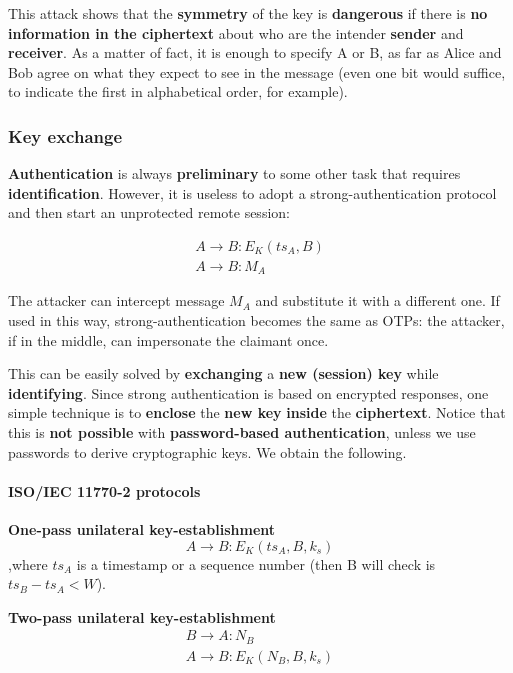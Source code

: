 This attack shows that the \textbf{symmetry} of the key is \textbf{dangerous} if there is \textbf{no information in the ciphertext} about who are the intender \textbf{sender} and \textbf{receiver}. As a matter of fact, it is enough to specify A or B, as far as Alice and Bob agree on what they expect to see in the message (even one bit would suffice, to indicate the first in alphabetical order, for example).

\subsubsection{Key exchange}
\textbf{Authentication} is always \textbf{preliminary} to some other task that requires \textbf{identification}. However, it is useless to adopt a strong-authentication protocol and then start an unprotected remote session:

$$\begin{array}{l} A \rightarrow B: E_K(ts_A,B)\\A \rightarrow B: M_A \end{array}$$

The attacker can intercept message $M_A$ and substitute it with a different one. If used in this way, strong-authentication becomes the same as OTPs: the attacker, if in the middle, can impersonate the claimant once.

This can be easily solved by \textbf{exchanging} a \textbf{new (session) key} while \textbf{identifying}. Since strong authentication is based on encrypted responses, one simple technique is to \textbf{enclose} the \textbf{new key} \textbf{inside} the \textbf{ciphertext}. Notice that this is \textbf{not possible} with \textbf{password-based authentication}, unless we use passwords to derive cryptographic keys. We obtain the following.

\paragraph{ISO/IEC 11770-2 protocols}

\textbf{One-pass unilateral key-establishment}
$$A \rightarrow B: E_K(ts_A,B,k_s)$$
,where $ts_A$ is a timestamp or a sequence number (then B will check is $ts_B - ts_A < W$).

\textbf{Two-pass unilateral key-establishment}
$$\begin{array}{l} B \rightarrow A: N_B\\A \rightarrow B: E_K(N_B, B,k_s) \end{array}$$

